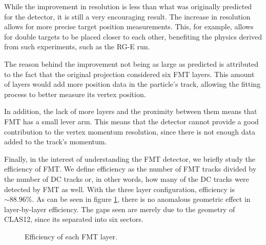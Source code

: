 
    While the improvement in resolution is less than what was originally predicted for the detector, it is still a very encouraging result.
    The increase in resolution allows for more precise target position measurements.
    This, for example, allows for double targets to be placed closer to each other, benefiting the physics derived from such experiments, such as the RG-E run. %

    The reason behind the improvement not being as large as predicted is attributed to the fact that the original projection considered six FMT layers.
    This amount of layers would add more position data in the particle's track, allowing the fitting process to better measure its vertex position.

    In addition, the lack of more layers and the proximity between them means that FMT has a small lever arm.
    This means that the detector cannot provide a good contribution to the vertex momentum resolution, since there is not enough data added to the track's momentum. %

    Finally, in the interest of understanding the FMT detector, we briefly study the efficiency of FMT.
    We define efficiency as the number of FMT tracks divided by the number of DC tracks or, in other words, how many of the DC tracks were detected by FMT as well.
    With the three layer configuration, efficiency is $\sim 88.96\%$.
    As can be seen in figure \ref{fig::fmt_efficiency}, there is no anomalous geometric effect in layer-by-layer efficiency.
    The gaps seen are merely due to the geometry of CLAS12, since its separated into six sectors.

    \begin{figure}[b]
        \centering{}
        \caption[FMT layers efficiency]{Efficiency of each FMT layer.}
        \label{fig::fmt_efficiency}
    \end{figure}
